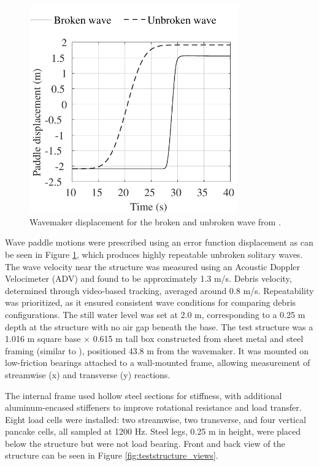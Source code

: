 \documentclass{article}
\begin{document}
{\begin{figure}[htbp]
  \centering
  \includegraphics[width=0.8\textwidth]{WavemakerDisp.pdf}
  \caption{Wavemaker displacement for the broken and unbroken wave from \citep{winterTsunamiLikeWaveForces2020} .}
  \label{fig:wavemakerdisp}
\end{figure}


Wave paddle motions were prescribed using an error function displacement as can be seen in Figure \ref{fig:wavemakerdisp}, which produces highly repeatable unbroken solitary waves. The wave velocity near the structure was measured using an Acoustic Doppler Velocimeter (ADV) and found to be approximately 1.3 m/s. Debris velocity, determined through video-based tracking, averaged around 0.8 m/s.
Repeatability was prioritized, as it ensured consistent wave conditions for comparing debris configurations. The still water level was set at 2.0 m, corresponding to a 0.25 m depth at the structure with no air gap beneath the base. The test structure was a 1.016 m square base × 0.615 m tall box constructed from sheet metal and steel framing (similar to \citep{winterTsunamiLikeWaveForces2020}), positioned 43.8 m from the wavemaker. It was mounted on low-friction bearings attached to a wall-mounted frame, allowing measurement of streamwise (x) and transverse (y) reactions.

The internal frame used hollow steel sections for stiffness, with additional aluminum-encased stiffeners to improve rotational resistance and load transfer. Eight load cells were installed: two streamwise, two transverse, and four vertical pancake cells, all sampled at 1200 Hz. Steel legs, 0.25 m in height, were placed below the structure but were not load bearing. Front and back view of the structure can be seen in Figure \ref{fig:teststructure_views}.

}
\end{document}
